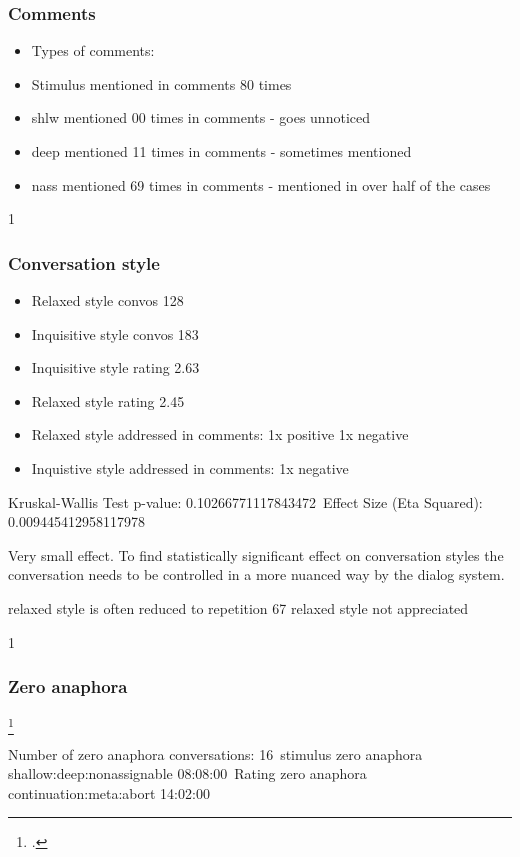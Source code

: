 \subsubsection{Comments}

\begin{itemize}
\item Types of comments:
\item Stimulus mentioned in comments 80 times
\item shlw mentioned 00 times in comments - goes unnoticed
\item deep mentioned 11 times in comments - sometimes mentioned
\item nass mentioned 69 times in comments - mentioned in over half of the cases
\end{itemize}

1
\subsubsection{Conversation style}

\begin{itemize}
\item Relaxed style convos 128
\item Inquisitive style convos 183
\item Inquisitive style rating 2.63
\item Relaxed style rating 2.45
\item Relaxed style addressed in comments: 1x positive 1x negative
\item Inquistive style addressed in comments: 1x negative
\end{itemize}

Kruskal-Wallis Test p-value: 0.10266771117843472\
Effect Size (Eta Squared): 0.009445412958117978

Very small effect.
To find statistically significant effect on conversation styles
the conversation needs to be controlled in a more nuanced way by the dialog system.

relaxed style is often reduced to repetition
67 relaxed style not appreciated

1
\subsubsection{Zero anaphora}

\footcite{zero}

Number of zero anaphora conversations: 16\
stimulus zero anaphora shallow:deep:nonassignable 08:08:00\
Rating zero anaphora continuation:meta:abort 14:02:00

